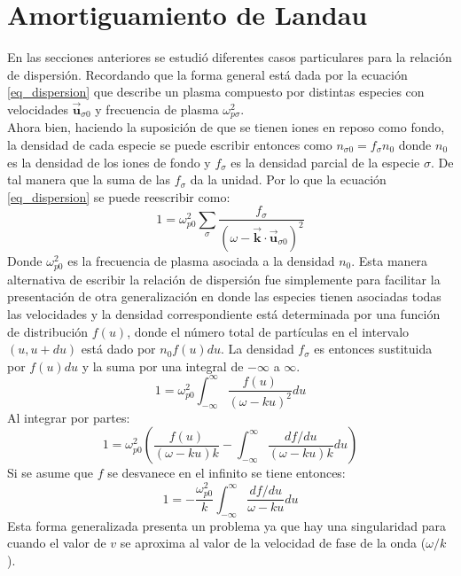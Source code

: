 \documentclass[../tesis_main_file.tex]{subfiles}
\begin{document}
\section{Amortiguamiento de Landau}
En las secciones anteriores se estudió diferentes casos particulares para la relación de dispersión. Recordando que la forma general está dada por la ecuación \ref{eq_dispersion} que describe un plasma compuesto por distintas especies con velocidades $\overrightarrow{\textbf{u}}_{\sigma 0}$ y frecuencia de plasma $\omega^2_{p \sigma}$.\\
Ahora bien, haciendo la suposición de que se tienen iones en reposo como fondo, la densidad de cada especie se puede escribir entonces como $n_{\sigma 0} = f_{\sigma}n_0$ donde $n_0$ es la densidad de los iones de fondo y $f_{\sigma}$ es la densidad parcial de la especie $\sigma$. De tal manera que la suma de las $f_{\sigma}$ da la unidad. Por lo que la ecuación \ref{eq_dispersion} se puede reescribir como:
\begin{equation}
\label{eq:dispersion_general_1}
1 =\omega^2_{p0}\sum_{\sigma}\frac{f_{\sigma}}{(\omega - \overrightarrow{\textbf{k}}\cdot \overrightarrow{\textbf{u}}_{\sigma 0})^2}
\end{equation}
Donde $\omega^2_{p0}$ es la frecuencia de plasma asociada a la densidad $n_0$. Esta manera alternativa de escribir la relación de dispersión fue simplemente para facilitar la presentación de otra generalización en donde las especies tienen asociadas todas las velocidades y la densidad correspondiente está determinada por una función de distribución $f(u)$, donde el número total de partículas en el intervalo $(u,u+du)$ está dado por $n_0f(u)du$. La densidad $f_{\sigma}$ es entonces sustituida por $f(u)du$ y la suma por una integral de $-\infty$ a $\infty$.
\begin{equation}
\label{eq:dispersion_general_2}
1= \omega^2_{p0}\int^{\infty}_{-\infty}\frac{f(u)}{(\omega-k u)^2}du
\end{equation}
Al integrar por partes:
\begin{equation}
1=\omega^2_{p0}\left(\frac{f(u)}{(\omega - ku)k}- \int^{\infty}_{-\infty}\frac{df/du}{(\omega -k u)k}du \right)
\end{equation}
Si se asume que $f$ se desvanece en el infinito se tiene entonces:
\begin{equation}
1=-\frac{\omega^2_{p0}}{k}\int^{\infty}_{-\infty}\frac{df/du}{\omega -k u}du
\end{equation}
Esta forma generalizada presenta un problema ya que hay una singularidad para cuando el valor de $v$ se aproxima al valor de la velocidad de fase de la onda ($\omega/k$).\\
\end{document}
